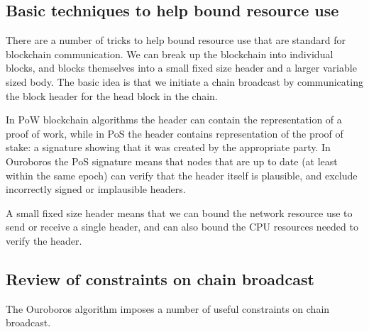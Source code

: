 \documentclass{article}
\theoremstyle{definition}{
  \newtheorem{lemma}{Lemma}[section] %
  \newtheorem{definition}[lemma]{Definition}
}
\theoremstyle{theorem}{
  \newtheorem{invariant}[lemma]{Invariant}
  \newtheorem{proofobligation}[lemma]{Proof Obligation}
}
\numberwithin{equation}{lemma}
\begin{document}
\subsection{Basic techniques to help bound resource use}

There are a number of tricks to help bound resource use that are standard for
blockchain communication. We can break up the blockchain into individual blocks,
and blocks themselves into a small fixed size header and a larger variable
sized body. The basic idea is that we initiate a chain broadcast by
communicating the block header for the head block in the chain.

In PoW blockchain algorithms the header can contain the representation of a
proof of work, while in PoS the header contains representation of the proof of
stake: a signature showing that it was created by the appropriate party. In
Ouroboros the PoS signature means that nodes that are up to date (at least
within the same epoch) can verify that the header itself is plausible, and
exclude incorrectly signed or implausible headers.

A small fixed size header means that we can bound the network resource use
to send or receive a single header, and can also bound the CPU resources needed
to verify the header.

\subsection{Review of constraints on chain broadcast}

The Ouroboros algorithm imposes a number of useful constraints on chain
broadcast.
\end{document}
